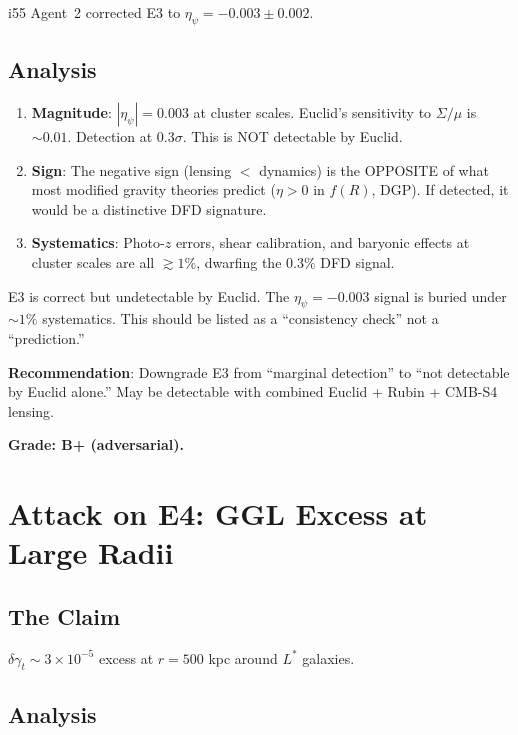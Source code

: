 \documentclass[11pt,a4paper]{article}
\begin{document}
i55 Agent~2 corrected E3 to $\eta_\psi = -0.003 \pm 0.002$.

\subsection{Analysis}

\begin{enumerate}
\item \textbf{Magnitude}: $|\eta_\psi| = 0.003$ at cluster scales. Euclid's sensitivity to $\Sigma/\mu$ is $\sim 0.01$. Detection at $0.3\sigma$. This is NOT detectable by Euclid.

\item \textbf{Sign}: The negative sign (lensing $<$ dynamics) is the OPPOSITE of what most modified gravity theories predict ($\eta > 0$ in $f(R)$, DGP). If detected, it would be a distinctive DFD signature.

\item \textbf{Systematics}: Photo-$z$ errors, shear calibration, and baryonic effects at cluster scales are all $\gtrsim 1\%$, dwarfing the $0.3\%$ DFD signal.
\end{enumerate}

\begin{tcolorbox}[colback=yellow!5!white, colframe=yellow!60!black, title={Agent 14: E3 Attack --- WEAK PREDICTION}]
E3 is correct but undetectable by Euclid. The $\eta_\psi = -0.003$ signal is buried under $\sim 1\%$ systematics. This should be listed as a ``consistency check'' not a ``prediction.''

\textbf{Recommendation}: Downgrade E3 from ``marginal detection'' to ``not detectable by Euclid alone.'' May be detectable with combined Euclid + Rubin + CMB-S4 lensing.

\textbf{Grade: B+ (adversarial).}
\end{tcolorbox}

\section{Attack on E4: GGL Excess at Large Radii}

\subsection{The Claim}

$\delta\gamma_t \sim 3 \times 10^{-5}$ excess at $r = 500$ kpc around $L^*$ galaxies.

\subsection{Analysis}
\end{document}
